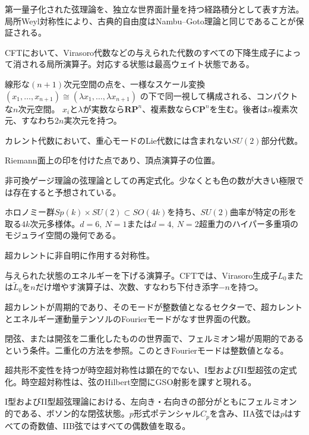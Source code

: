 {第一量子化された弦理論を、独立な世界面計量を持つ経路積分として表す方法。局所Weyl対称性により、古典的自由度はNambu--Goto理論と同じであることが保証される。}

{CFTにおいて、Virasoro代数などの与えられた代数のすべての下降生成子によって消される局所演算子。対応する状態は最高ウェイト状態である。}

{線形な$(n+1)$次元空間の点を、一様なスケール変換
$(x_1,\ldots,x_{n+1})\cong(\lambda x_1,\ldots,\lambda x_{n+1})$
の下で同一視して構成される、コンパクトな$n$次元空間。
$x_i$と$\lambda$が実数なら$\mathbf{RP}^n$、複素数なら$\mathbf{CP}^n$を生む。後者は$n$複素次元、すなわち$2n$実次元を持つ。}

{カレント代数において、重心モードのLie代数には含まれない$SU(2)$部分代数。}

{Riemann面上の印を付けた点であり、頂点演算子の位置。}

{非可換ゲージ理論の弦理論としての再定式化。少なくとも色の数が大きい極限では存在すると予想されている。}

{ホロノミー群$Sp(k)\times SU(2)\subset SO(4k)$を持ち、$SU(2)$曲率が特定の形を取る$4k$次元多様体。$d=6,\ N=1$または$d=4,\ N=2$超重力のハイパー多重項のモジュライ空間の幾何である。}

{超カレントに非自明に作用する対称性。}

{与えられた状態のエネルギーを下げる演算子。CFTでは、Virasoro生成子$L_0$または$\widetilde L_0$を$n$だけ増やす演算子は、次数、すなわち下付き添字$-n$を持つ。}

{超カレントが周期的であり、そのモードが整数値となるセクターで、超カレントとエネルギー運動量テンソルのFourierモードがなす世界面の代数。}

{閉弦、または開弦を二重化したものの世界面で、フェルミオン場が周期的であるという条件。二重化の方法を参照。このときFourierモードは整数値となる。}

{超共形不変性を持つが時空超対称性は顕在的でない、I型およびII型超弦の定式化。時空超対称性は、弦のHilbert空間にGSO射影を課すと現れる。}

{I型およびII型超弦理論における、左向き・右向きの部分がともにフェルミオン的である、ボソン的な閉弦状態。$p$形式ポテンシャル$C_p$を含み、IIA弦では$p$はすべての奇数値、IIB弦ではすべての偶数値を取る。}

